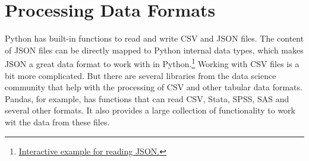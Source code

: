 \documentclass{article}
\begin{document}
\section{Processing Data Formats}

Python has built-in functions to read and write CSV and JSON files.
The content of JSON files can be directly mapped to Python internal data types,
which makes JSON a great data format to work with in Python.\footnote{
\href{http://pythontutor.com/visualize.html#code=import%20json%0A%0Asome_unparsed_json%3A%20str%20%3D%20%22%22%22%7B%0A%22my_key%22%3A%20%22my_value%22,%0A%22my_list_key%22%3A%20%5B1,%202,%203%5D%0A%7D%0A%22%22%22%0A%0Aparsed_json%20%3D%20json.loads%28some_unparsed_json%29%0Aprint%28parsed_json%5B%22my_list_key%22%5D%29&cumulative=false&curInstr=0&heapPrimitives=nevernest&mode=display&origin=opt-frontend.js&py=3&rawInputLstJSON=%5B%5D&textReferences=false}{Interactive example for reading JSON.}
}
Working with CSV files is a bit more complicated.
But there are several libraries from the data science community that help with
the processing of CSV and other tabular data formats.
Pandas, for example, has functions that can read CSV,
Stata, SPSS, SAS and several other formats.
It also provides a large collection of functionality to work wit the data from these files.


\printbibliography[type=book,title={Book Sources}]
\end{document}
